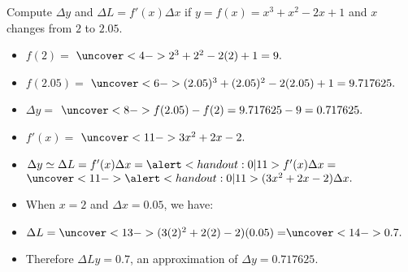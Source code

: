 \begin{frame}
\begin{example}%
Compute $\Delta y$ and $\Delta L= f'(x) \Delta x$ if $y = f(x) = x^3 + x^2 - 2x + 1$ and $x$ changes from $2$ to $2.05$.
\begin{itemize}
\item<2-| alert@3-4>  $f(2) =$ $\uncover<4->{2^3+2^2-2(2)+1 = 9.}$
\item<2-| alert@5-6>  $f(2.05) =$ $\uncover<6->{(2.05)^3+(2.05)^2-2(2.05)+1 = 9.717625.}$
\item<2-| alert@7-8>  $\Delta y =$ $\uncover<8->{f(2.05) - f(2) = 9.717625 - 9 = 0.717625.}$
\item<9-| alert@10-11>  $f'(x) = $ $\uncover<11->{3x^2 + 2x -2.}$
\item<9->  $\Delta y\simeq \Delta L= f'(x)\Delta x = \alert<handout:0| 11>{f'(x)}\Delta x = $ $\uncover<11->{\alert<handout:0| 11>{(3x^2+2x-2)}\Delta x.}$
\item<12->  When $x = 2$ and $\Delta x = 0.05$, we have:
\item<12-| alert@13-14>  $\Delta L = \uncover<13->{(3(2)^2 + 2(2) - 2)(0.05) =} \uncover<14->{0.7.}$
\item<15->  Therefore $\Delta L y = 0.7$, an approximation of $\Delta y = 0.717625$.
\end{itemize}
\end{example}
\end{frame}
